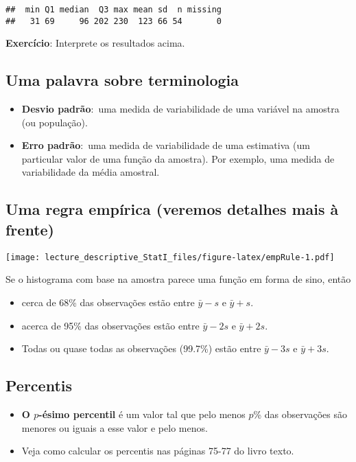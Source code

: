 \documentclass[]{article}
\providecommand{\tightlist}{%
  \setlength{\itemsep}{0pt}\setlength{\parskip}{0pt}}
\begin{document}
\begin{verbatim}
##  min Q1 median  Q3 max mean sd  n missing
##   31 69     96 202 230  123 66 54       0
\end{verbatim}

\textbf{Exercício}: Interprete os resultados acima.

\subsection{Uma palavra sobre
terminologia}\label{uma-palavra-sobre-terminologia}

\begin{itemize}
\tightlist
\item
  \textbf{Desvio padrão}:~uma medida de variabilidade de uma variável na
  amostra (ou população).
\item
  \textbf{Erro padrão}:~uma medida de variabilidade de uma estimativa
  (um particular valor de uma função da amostra). Por exemplo, uma
  medida de variabilidade da média amostral.
\end{itemize}

\subsection{Uma regra empírica (veremos detalhes mais à
frente)}\label{uma-regra-empirica-veremos-detalhes-mais-a-frente}

\texttt{[image: lecture\_descriptive\_StatI\_files/figure-latex/empRule-1.pdf]}

Se o histograma com base na amostra parece uma função em forma de sino,
então

\begin{itemize}
\tightlist
\item
  cerca de 68\% das observações estão entre \(\bar{y}-s\) e
  \(\bar{y}+s\).
\item
  acerca de 95\% das observações estão entre \(\bar{y}-2s\) e
  \(\bar{y}+2s\).
\item
  Todas ou quase todas as observações (99.7\%) estão entre
  \(\bar{y}-3s\) e \(\bar{y}+3s\).
\end{itemize}

\subsection{Percentis}\label{percentis}

\begin{itemize}
\item
  \textbf{O \(p\)-ésimo percentil} é um valor tal que pelo menos \(p\)\%
  das observações são menores ou iguais a esse valor e pelo menos.
\item
  Veja como calcular os percentis nas páginas 75-77 do livro texto.
\end{itemize}
\end{document}
